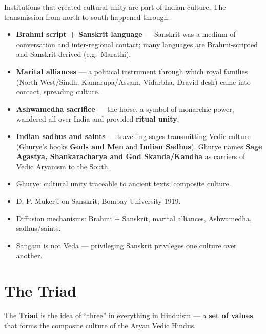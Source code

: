 Institutions that created cultural unity are part of Indian culture. The transmission from north to south happened through:
\begin{itemize}
\item \textbf{Brahmi script + Sanskrit language} --- Sanskrit was a medium of conversation and inter-regional contact; many languages are Brahmi-scripted and Sanskrit-derived (e.g.\ Marathi).
\item \textbf{Marital alliances} --- a political instrument through which royal families (North-West/Sindh, Kamarupa/Assam, Vidarbha, Dravid desh) came into contact, spreading culture.
\item \textbf{Ashwamedha sacrifice} --- the horse, a symbol of monarchic power, wandered all over India and provided \textbf{ritual unity}.
\item \textbf{Indian sadhus and saints} --- travelling sages transmitting Vedic culture (Ghurye's books \textbf{Gods and Men} and \textbf{Indian Sadhus}). Ghurye names \textbf{Sage Agastya, Shankaracharya and God Skanda/Kandha} as carriers of Vedic Aryanism to the South.
\end{itemize}

\begin{QuickRevision}
\begin{itemize}
\item Ghurye: cultural unity traceable to ancient texts; composite culture.
\item D. P. Mukerji on Sanskrit; Bombay University 1919.
\item Diffusion mechanisms: Brahmi + Sanskrit, marital alliances, Ashwamedha, sadhus/saints.
\item Sangam is not Veda --- privileging Sanskrit privileges one culture over another.
\end{itemize}
\end{QuickRevision}

\section{The Triad}

\begin{KeyConcept}
The \textbf{Triad} is the idea of ``three'' in everything in Hinduism --- a \textbf{set of values} that forms the composite culture of the Aryan Vedic Hindus.
\end{KeyConcept}

